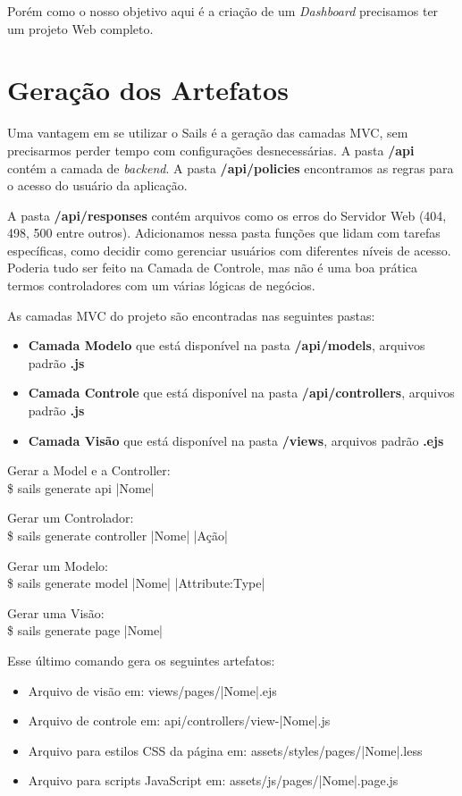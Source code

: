 \documentclass[a4paper,11pt]{article}
\begin{document}
Porém como o nosso objetivo aqui é a criação de um \textit{Dashboard} precisamos ter um projeto Web completo.

\section{Geração dos Artefatos}
Uma vantagem em se utilizar o Sails é a geração das camadas MVC, sem precisarmos perder tempo com configurações desnecessárias. A pasta \textbf{/api} contém a camada de \textit{backend}. A pasta \textbf{/api/policies} encontramos as regras para o acesso do usuário da aplicação. 

A pasta \textbf{/api/responses} contém arquivos como os erros do Servidor Web (404, 498, 500 entre outros). Adicionamos nessa pasta funções que lidam com tarefas específicas, como decidir como gerenciar usuários com diferentes níveis de acesso. Poderia tudo ser feito na Camada de Controle, mas não é uma boa prática termos controladores com um várias lógicas de negócios.

As camadas MVC do projeto são encontradas nas seguintes pastas: \vspace{-1em}
\begin{itemize}
  \item \textbf{Camada Modelo} que está disponível na pasta \textbf{/api/models}, arquivos padrão \textbf{.js}
  \item \textbf{Camada Controle} que está disponível na pasta \textbf{/api/controllers}, arquivos padrão \textbf{.js}
  \item \textbf{Camada Visão} que está disponível na pasta \textbf{/views}, arquivos padrão \textbf{.ejs}
\end{itemize}

Gerar a Model e a Controller: \\
{\ttfamily\$ sails generate api |Nome|}

Gerar um Controlador: \\
{\ttfamily\$ sails generate controller |Nome| |Ação|}

Gerar um Modelo: \\
{\ttfamily\$ sails generate model |Nome| |Attribute:Type|}

Gerar uma Visão: \\
{\ttfamily\$ sails generate page |Nome|}

Esse último comando gera os seguintes artefatos: \vspace{-1em}
\begin{itemize}
	\item Arquivo de visão em: {\ttfamily views/pages/|Nome|.ejs}
	\item Arquivo de controle em: {\ttfamily api/controllers/view-|Nome|.js}
	\item Arquivo para estilos CSS da página em: {\ttfamily assets/styles/pages/|Nome|.less}
	\item Arquivo para scripts JavaScript em: {\ttfamily assets/js/pages/|Nome|.page.js}
\end{itemize}
\end{document}
